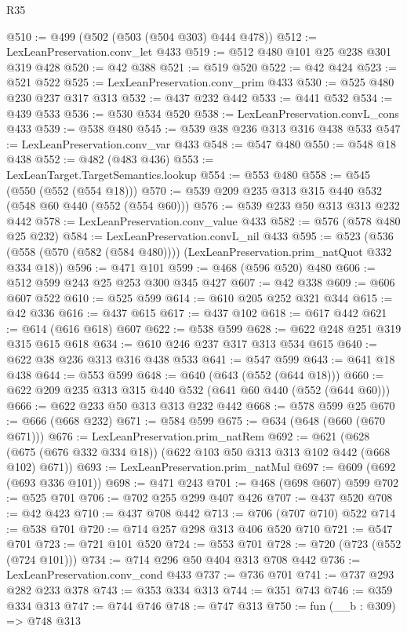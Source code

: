 \begin{lexlean}{R35}
\begin{coremodule}
@510 := @499 (@502 (@503 (@504 @303) @444 @478))
@512 := LexLeanPreservation.conv_let @433
@519 := @512 @480 @101 @25 @238 @301 @319 @428
@520 := @42 @388
@521 := @519 @520
@522 := @42 @424
@523 := @521 @522
@525 := LexLeanPreservation.conv_prim @433
@530 := @525 @480 @230 @237 @317 @313
@532 := @437 @232 @442
@533 := @441 @532
@534 := @439 @533
@536 := @530 @534 @520
@538 := LexLeanPreservation.convL_cons @433
@539 := @538 @480
@545 := @539 @38 @236 @313 @316 @438 @533
@547 := LexLeanPreservation.conv_var @433
@548 := @547 @480
@550 := @548 @18 @438
@552 := @482 (@483 @436)
@553 := LexLeanTarget.TargetSemantics.lookup
@554 := @553 @480
@558 := @545 (@550 (@552 (@554 @18)))
@570 := @539 @209 @235 @313 @315 @440 @532 (@548 @60 @440 (@552 (@554 @60)))
@576 := @539 @233 @50 @313 @313 @232 @442
@578 := LexLeanPreservation.conv_value @433
@582 := @576 (@578 @480 @25 @232)
@584 := LexLeanPreservation.convL_nil @433
@595 := @523
    (@536 (@558 (@570 (@582 (@584 @480)))) (LexLeanPreservation.prim_natQuot @332 @334 @18))
@596 := @471 @101
@599 := @468 (@596 @520) @480
@606 := @512 @599 @243 @25 @253 @300 @345 @427
@607 := @42 @338
@609 := @606 @607 @522
@610 := @525 @599
@614 := @610 @205 @252 @321 @344
@615 := @42 @336
@616 := @437 @615
@617 := @437 @102
@618 := @617 @442
@621 := @614 (@616 @618) @607
@622 := @538 @599
@628 := @622 @248 @251 @319 @315 @615 @618
@634 := @610 @246 @237 @317 @313 @534 @615
@640 := @622 @38 @236 @313 @316 @438 @533
@641 := @547 @599
@643 := @641 @18 @438
@644 := @553 @599
@648 := @640 (@643 (@552 (@644 @18)))
@660 := @622 @209 @235 @313 @315 @440 @532 (@641 @60 @440 (@552 (@644 @60)))
@666 := @622 @233 @50 @313 @313 @232 @442
@668 := @578 @599 @25
@670 := @666 (@668 @232)
@671 := @584 @599
@675 := @634 (@648 (@660 (@670 @671)))
@676 := LexLeanPreservation.prim_natRem
@692 := @621 (@628 (@675 (@676 @332 @334 @18)) (@622 @103 @50 @313 @313 @102 @442 (@668 @102) @671))
@693 := LexLeanPreservation.prim_natMul
@697 := @609 (@692 (@693 @336 @101))
@698 := @471 @243
@701 := @468 (@698 @607) @599
@702 := @525 @701
@706 := @702 @255 @299 @407 @426
@707 := @437 @520
@708 := @42 @423
@710 := @437 @708 @442
@713 := @706 (@707 @710) @522
@714 := @538 @701
@720 := @714 @257 @298 @313 @406 @520 @710
@721 := @547 @701
@723 := @721 @101 @520
@724 := @553 @701
@728 := @720 (@723 (@552 (@724 @101)))
@734 := @714 @296 @50 @404 @313 @708 @442
@736 := LexLeanPreservation.conv_cond @433
@737 := @736 @701
@741 := @737 @293 @282 @233 @378
@743 := @353 @334 @313
@744 := @351 @743
@746 := @359 @334 @313
@747 := @744 @746
@748 := @747 @313
@750 := fun (__b : @309) => @748 @313

\end{coremodule}
\end{lexlean}
